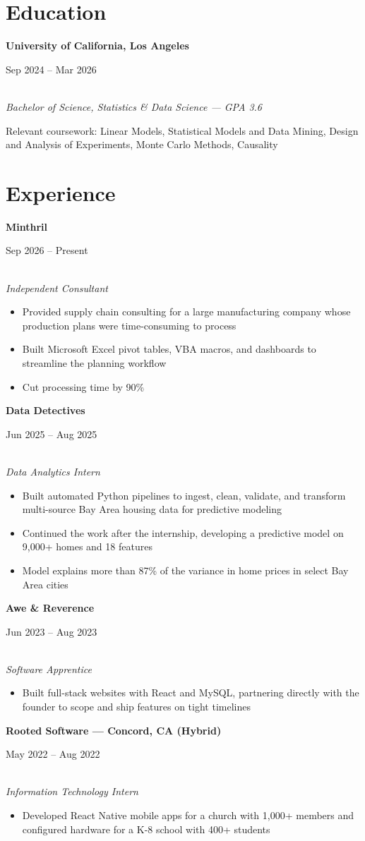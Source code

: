 \documentclass[11pt,letterpaper]{article}
\newcommand{\entry}[3]{%
  \noindent\begin{minipage}[t]{0.72\textwidth}\raggedright\textbf{#1}\end{minipage}%
  \hfill\begin{minipage}[t]{0.26\textwidth}\raggedleft\small\color{gray}#2\end{minipage}\\
  \textit{#3}\par\vspace{2pt}
}
\newcommand{\entryhl}[3]{%
  \noindent\begin{minipage}[t]{0.72\textwidth}\raggedright\textbf{\color{accent}#1}\end{minipage}%
  \hfill\begin{minipage}[t]{0.26\textwidth}\raggedleft\small\color{gray}#2\end{minipage}\\
  \textit{#3}\par\vspace{2pt}
}
\begin{document}


\vspace{4pt}

\section*{Education}
\entry{University of California, Los Angeles}{Sep 2024 -- Mar 2026}{Bachelor of Science, Statistics \& Data Science --- GPA 3.6}
\small Relevant coursework: Linear Models, Statistical Models and Data Mining, Design and Analysis of Experiments, Monte Carlo Methods, Causality

\section*{Experience}

\entryhl{Minthril}{Sep 2026 -- Present}{Independent Consultant}
\begin{itemize}
  \item Provided supply chain consulting for a large manufacturing company whose production plans were time-consuming to process
  \item Built Microsoft Excel pivot tables, VBA macros, and dashboards to streamline the planning workflow
  \item Cut processing time by 90\%
\end{itemize}

\entryhl{Data Detectives}{Jun 2025 -- Aug 2025}{Data Analytics Intern}
\begin{itemize}
  \item Built automated Python pipelines to ingest, clean, validate, and transform multi-source Bay Area housing data for predictive modeling
  \item Continued the work after the internship, developing a predictive model on 9,000+ homes and 18 features
  \item Model explains more than 87\% of the variance in home prices in select Bay Area cities
\end{itemize}

\entry{Awe \& Reverence}{Jun 2023 -- Aug 2023}{Software Apprentice}
\begin{itemize}
  \item Built full-stack websites with React and MySQL, partnering directly with the founder to scope and ship features on tight timelines
\end{itemize}

\entry{Rooted Software --- Concord, CA (Hybrid)}{May 2022 -- Aug 2022}{Information Technology Intern}
\begin{itemize}
  \item Developed React Native mobile apps for a church with 1,000+ members and configured hardware for a K-8 school with 400+ students
\end{itemize}
\end{document}
